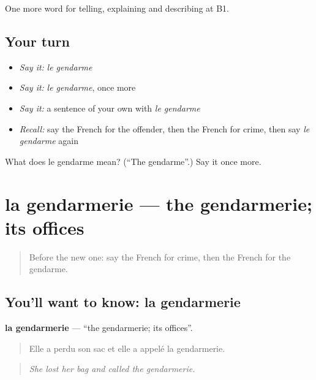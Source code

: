 \begin{grammarlens}[title={What you've built}]
One more word for telling, explaining and describing at B1.
\end{grammarlens}

\subsection*{Your turn}
\begin{itemize}
\raggedright
  \item \emph{Say it:} \emph{le gendarme}
  \item \emph{Say it:} \emph{le gendarme}, once more
  \item \emph{Say it:} a sentence of your own with \emph{le gendarme}
  \item \emph{Recall:} say the French for the offender, then the French for crime, then say \emph{le gendarme} again
\end{itemize}

\begin{tcolorbox}[breakable,colback=teal!4,colframe=teal!35!black,title={Before you move on}]
What does le gendarme mean? (\textquotedblleft{}The gendarme\textquotedblright{}.) Say it once more.
\end{tcolorbox}
\section[la gendarmerie]{la gendarmerie — the gendarmerie; its offices}

\label{lesson:FR-C291-gendarmerie}



\begin{quote}
Before the new one: say the French for crime, then the French for the gendarme.
\end{quote}

\subsection*{You'll want to know: la gendarmerie}
\textbf{la gendarmerie} — \textquotedblleft{}the gendarmerie; its offices\textquotedblright{}.

\begin{quote}
Elle a perdu son sac et elle a appelé la gendarmerie.
\end{quote}

\begin{quote}
\emph{She lost her bag and called the gendarmerie.}
\end{quote}

